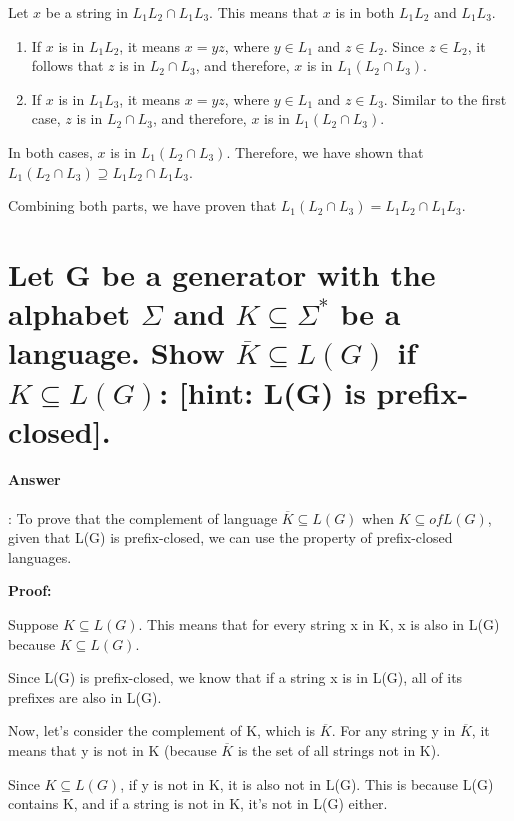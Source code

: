 \documentclass{article}
\begin{document}
\begin{itemize}
  Let $x$ be a string in $L_1L_2 \cap L_1L_3$. This means that $x$ is in both $L_1L_2$ and $L_1L_3$.

  \begin{enumerate}
    \item If $x$ is in $L_1L_2$, it means $x = yz$, where $y \in L_1$ and $z \in L_2$. Since $z \in L_2$, it follows that $z$ is in $L_2 \cap L_3$, and therefore, $x$ is in $L_1(L_2 \cap L_3)$.
    \item If $x$ is in $L_1L_3$, it means $x = yz$, where $y \in L_1$ and $z \in L_3$. Similar to the first case, $z$ is in $L_2 \cap L_3$, and therefore, $x$ is in $L_1(L_2 \cap L_3)$.
  \end{enumerate}
  
  In both cases, $x$ is in $L_1(L_2 \cap L_3)$. Therefore, we have shown that $L_1(L_2 \cap L_3) \supseteq L_1L_2 \cap L_1L_3$.

  Combining both parts, we have proven that $L_1(L_2 \cap L_3) = L_1L_2 \cap L_1L_3$.

\end{itemize}




\section{Let G be a generator with the alphabet $\Sigma$ and $K \subseteq \Sigma^*$ be a language. Show $\overline{K} \subseteq L(G)$ if $K \subseteq L(G)$: [hint: L(G) is prefix-closed].}

\paragraph{Answer}:
To prove that the complement of language $\overline{K} \subseteq L(G)$ when $K \subseteq of L(G)$, given that L(G) is prefix-closed, we can use the property of prefix-closed languages.

\textbf{Proof:}

Suppose $K \subseteq L(G)$. This means that for every string x in K, x is also in L(G) because $K \subseteq L(G)$.

Since L(G) is prefix-closed, we know that if a string x is in L(G), all of its prefixes are also in L(G).

Now, let's consider the complement of K, which is $\overline{K}$. For any string y in $\overline{K}$, it means that y is not in K (because $\overline{K}$ is the set of all strings not in K).

Since $K \subseteq L(G)$, if y is not in K, it is also not in L(G). This is because L(G) contains K, and if a string is not in K, it's not in L(G) either.
\end{document}
